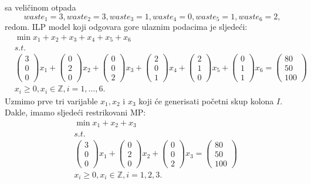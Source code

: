 \documentclass[a4paper, utf8, 11pt, colorlinks]{book}
\theoremstyle{definition}
\begin{document}
sa veličinom otpada 
$$ waste_1 = 3, waste_2 = 3, waste_3 = 1, waste_4 = 0, waste_5 = 1, waste_6 = 2,$$
redom. 
ILP model koji odgovara gore ulaznim podacima je sljedeći:
\begin{align*}
	 &\min x_1 + x_2 + x_3 + x_4 + x_5 + x_6 \\
	 &s.t. \\
	 &\begin{pmatrix}
	 	3 \\
	 	0 \\
	 	0  
	 \end{pmatrix} x_1 + \begin{pmatrix}
	 0 \\
	 2 \\
	 0  
 \end{pmatrix} x_2 +\begin{pmatrix}
 0 \\
 0 \\
 2  
\end{pmatrix} x_3 + 
 \begin{pmatrix}
	2 \\
	0 \\
	1  
\end{pmatrix} x_4 + 
 \begin{pmatrix}
	2 \\
	1 \\
	0  
\end{pmatrix} x_5 + 
\begin{pmatrix}
	0 \\
	1 \\
	1  
\end{pmatrix} x_6 = \begin{pmatrix}
      80 \\
      50 \\
      100
\end{pmatrix} \\
& x_i \geq 0, x_i \in \mathbb{Z}, i=1,\ldots,6.
\end{align*}
 Uzmimo prve tri varijable $x_1, x_2$ i $x_3$ koji će generisati početni skup kolona $I$.
 Dakle, imamo sljedeći restrikovani MP:
 \begin{align*}
 	 &\min x_1 + x_2 + x_3 \\
 	 & s.t. \\
 	 &\begin{pmatrix}
 	 	3 \\
 	 	0 \\
 	 	0  
 	 \end{pmatrix} x_1 + \begin{pmatrix}
 	 	0 \\
 	 	2 \\
 	 	0  
 	 \end{pmatrix} x_2 +\begin{pmatrix}
 	 	0 \\
 	 	0 \\
 	 	2  
 	 \end{pmatrix} x_3 = \begin{pmatrix}
  	     80 \\
  	     50 \\
  	     100
  \end{pmatrix} \\
  & x_i \geq 0, x_i \in \mathbb{Z}, i=1,2,3.
 \end{align*}  
\end{document}
